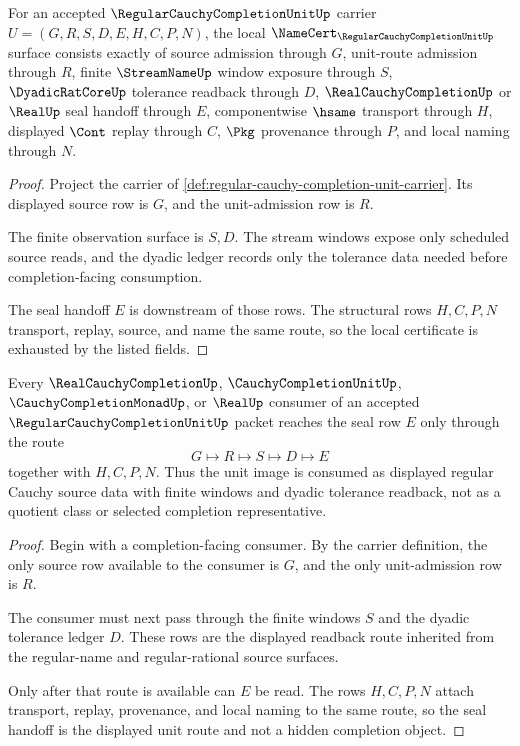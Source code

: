 \begin{theorem}
\label{thm:regular-cauchy-completion-unit-namecert-obligations}
For an accepted $\RegularCauchyCompletionUnitUp$ carrier $U=(G,R,S,D,E,H,C,P,N)$, the local $\NameCert_{\RegularCauchyCompletionUnitUp}$ surface consists exactly of source admission through $G$, unit-route admission through $R$, finite $\StreamNameUp$ window exposure through $S$, $\DyadicRatCoreUp$ tolerance readback through $D$, $\RealCauchyCompletionUp$ or $\RealUp$ seal handoff through $E$, componentwise $\hsame$ transport through $H$, displayed $\Cont$ replay through $C$, $\Pkg$ provenance through $P$, and local naming through $N$.
\end{theorem}
\begin{proof}
Project the carrier of \autoref{def:regular-cauchy-completion-unit-carrier}. Its displayed source row is $G$, and the unit-admission row is $R$.

The finite observation surface is $S,D$. The stream windows expose only scheduled source reads, and the dyadic ledger records only the tolerance data needed before completion-facing consumption.

The seal handoff $E$ is downstream of those rows. The structural rows $H,C,P,N$ transport, replay, source, and name the same route, so the local certificate is exhausted by the listed fields.
\end{proof}

\begin{theorem}
\label{thm:regular-cauchy-completion-unit-seal-handoff}
Every $\RealCauchyCompletionUp$, $\CauchyCompletionUnitUp$, $\CauchyCompletionMonadUp$, or $\RealUp$ consumer of an accepted $\RegularCauchyCompletionUnitUp$ packet reaches the seal row $E$ only through the route
$$
G\longmapsto R\longmapsto S\longmapsto D\longmapsto E
$$
together with $H,C,P,N$. Thus the unit image is consumed as displayed regular Cauchy source data with finite windows and dyadic tolerance readback, not as a quotient class or selected completion representative.
\end{theorem}
\begin{proof}
Begin with a completion-facing consumer. By the carrier definition, the only source row available to the consumer is $G$, and the only unit-admission row is $R$.

The consumer must next pass through the finite windows $S$ and the dyadic tolerance ledger $D$. These rows are the displayed readback route inherited from the regular-name and regular-rational source surfaces.

Only after that route is available can $E$ be read. The rows $H,C,P,N$ attach transport, replay, provenance, and local naming to the same route, so the seal handoff is the displayed unit route and not a hidden completion object.
\end{proof}

